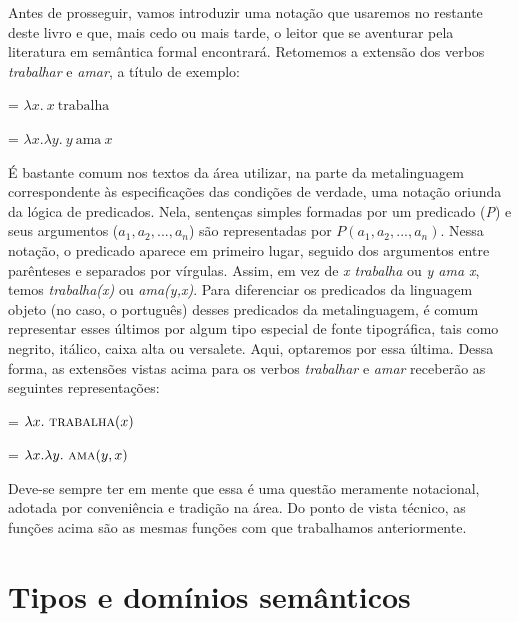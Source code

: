 Antes de prosseguir, vamos introduzir uma notação que usaremos no restante deste livro e que, mais cedo ou mais tarde, o leitor que se aventurar pela literatura em semântica formal encontrará. Retomemos a extensão dos verbos \textit{trabalhar} e \textit{amar}, a título de exemplo:

\begin{exe}
	\ex {} = $\lambda x.\ x\ \text{trabalha}$
\end{exe}

\begin{exe}
	\ex {} = $\lambda x.\lambda y.\ y\ \text{ama}\ x$
\end{exe}

\n É bastante comum nos textos da área utilizar, na parte da metalinguagem correspondente às especificações das condições de verdade, uma notação oriunda da lógica de predicados. Nela, sentenças simples formadas por um predicado (\textit{P}) e seus argumentos ($a_{1}, a_{2}, ..., a_{n}$) são representadas por $P(a_{1}, a_{2}, ..., a_{n})$. Nessa notação, o predicado aparece em primeiro lugar, seguido dos argumentos entre parênteses e separados por vírgulas. Assim, em vez de \textit{x trabalha} ou \textit{y ama x}, temos \textit{trabalha(x)} ou \textit{ama(y,x)}. Para diferenciar os predicados da linguagem objeto (no caso, o português)  desses predicados da metalinguagem, é comum representar esses últimos por algum tipo especial de fonte tipográfica, tais como negrito, itálico, caixa alta ou versalete. Aqui, optaremos por essa última. Dessa forma, as extensões vistas acima para os verbos \textit{trabalhar} e \textit{amar} receberão as seguintes representações:

\begin{exe}
	\ex {} = $\lambda x.\ \text{\textsc{trabalha}}(x)$
\end{exe} 

\begin{exe}
	\ex {} = $\lambda x.\lambda y.\ \text{\textsc{ama}}(y,x)$
\end{exe}

Deve-se sempre ter em mente que essa é uma questão meramente notacional, adotada por conveniência e tradição na área. Do ponto de vista técnico, as funções acima são as mesmas funções com que trabalhamos anteriormente.

\section{Tipos e domínios semânticos}

